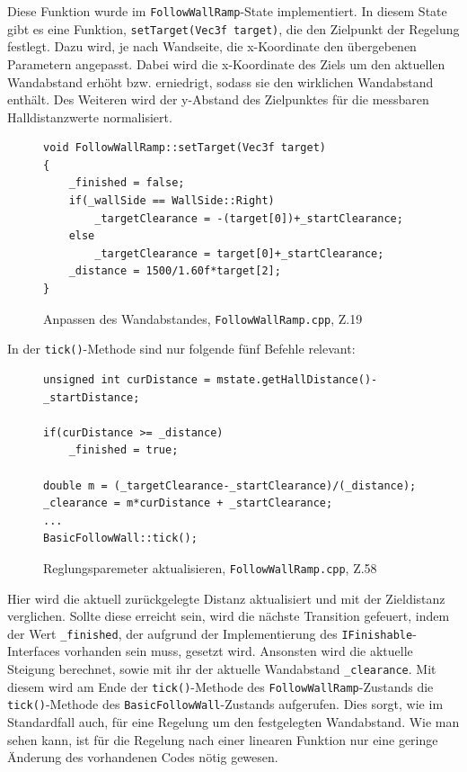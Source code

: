 \newline
\newline
Diese Funktion wurde im \texttt{FollowWallRamp}-State implementiert. In diesem State gibt es eine Funktion, \texttt{setTarget(Vec3f target)}, die den Zielpunkt der Regelung festlegt. Dazu wird, je nach Wandseite, die x-Koordinate den übergebenen Parametern angepasst. Dabei wird die x-Koordinate des Ziels um den aktuellen Wandabstand erhöht bzw. erniedrigt, sodass sie den wirklichen Wandabstand enthält. Des Weiteren wird der y-Abstand des Zielpunktes für die messbaren Halldistanzwerte normalisiert.
\newpage
\begin{figure}[H]
\begin{lstlisting}[style=json]
void FollowWallRamp::setTarget(Vec3f target)
{
	_finished = false;
	if(_wallSide == WallSide::Right)
		_targetClearance = -(target[0])+_startClearance;
	else
		_targetClearance = target[0]+_startClearance;
	_distance = 1500/1.60f*target[2];
}
\end{lstlisting}
\centering
\caption{Anpassen des Wandabstandes, \texttt{FollowWallRamp.cpp}, Z.19}
\end{figure}

In der \texttt{tick()}-Methode sind nur folgende fünf Befehle relevant:

\begin{figure}[H]
\begin{lstlisting}[style=json]
unsigned int curDistance = mstate.getHallDistance()-_startDistance;

if(curDistance >= _distance)
	_finished = true;

double m = (_targetClearance-_startClearance)/(_distance);
_clearance = m*curDistance + _startClearance;
...
BasicFollowWall::tick();
\end{lstlisting}
\centering
\caption{Reglungsparemeter aktualisieren, \texttt{FollowWallRamp.cpp}, Z.58}
\end{figure}

Hier wird die aktuell zurückgelegte Distanz aktualisiert und mit der Zieldistanz verglichen. Sollte diese erreicht sein, wird die nächste Transition gefeuert, indem der Wert \texttt{\_finished}, der aufgrund der Implementierung des \texttt{IFinishable}-Interfaces vorhanden sein muss, gesetzt wird. Ansonsten wird die aktuelle Steigung berechnet, sowie mit ihr der aktuelle Wandabstand \texttt{\_clearance}. Mit diesem wird am Ende der \texttt{tick()}-Methode des \texttt{FollowWallRamp}-Zustands die \texttt{tick()}-Methode des \texttt{BasicFollowWall}-Zustands aufgerufen. Dies sorgt, wie im Standardfall auch, für eine Regelung um den festgelegten Wandabstand. 
\newline
Wie man sehen kann, ist für die Regelung nach einer linearen Funktion nur eine geringe Änderung des vorhandenen Codes nötig gewesen. 
\newline

